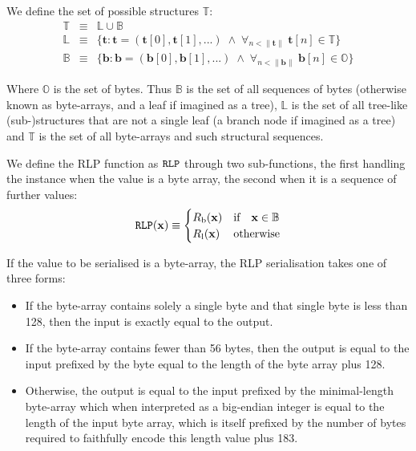\documentclass[9pt,oneside]{amsart}
\makeatletter
\newcommand{\linkdest}[1]{\Hy@raisedlink{\hypertarget{#1}{}}}
\makeatother
\begin{document}
We define the set of possible structures $\mathbb{T}$:
\begin{eqnarray}
\mathbb{T} & \equiv & \mathbb{L} \cup \mathbb{B} \\
\mathbb{L} & \equiv & \{ \mathbf{t}: \mathbf{t} = ( \mathbf{t}[0], \mathbf{t}[1], ... ) \; \wedge \; \forall_{n < \lVert \mathbf{t} \rVert} \; \mathbf{t}[n] \in \mathbb{T} \} \\
\mathbb{B} & \equiv & \{ \mathbf{b}: \mathbf{b} = ( \mathbf{b}[0], \mathbf{b}[1], ... ) \; \wedge \; \forall_{n < \lVert \mathbf{b} \rVert} \; \mathbf{b}[n] \in \mathbb{O} \}
\end{eqnarray}

Where $\mathbb{O}$ is the set of bytes. Thus $\mathbb{B}$ is the set of all sequences of bytes (otherwise known as byte-arrays, and a leaf if imagined as a tree), $\mathbb{L}$ is the set of all tree-like (sub-)structures that are not a single leaf (a branch node if imagined as a tree) and $\mathbb{T}$ is the set of all byte-arrays and such structural sequences.

We define the RLP function as $\mathtt{\tiny RLP}$ through two sub-functions, the first handling the instance when the value is a byte array, the second when it is a sequence of further values:
\begin{equation}
\mathtt{\tiny RLP}(\mathbf{x}) \equiv \begin{cases} R_{\mathrm{b}}(\mathbf{x}) & \text{if} \quad \mathbf{x} \in \mathbb{B} \\ R_{\mathrm{l}}(\mathbf{x}) & \text{otherwise} \end{cases}
\end{equation}

\hypertarget{RLP_serialisation_of_a_byte_array_R__b_word_def}{}\linkdest{R__b}If the value to be serialised is a byte-array, the RLP serialisation takes one of three forms:

\begin{itemize}
\item If the byte-array contains solely a single byte and that single byte is less than 128, then the input is exactly equal to the output.
\item If the byte-array contains fewer than 56 bytes, then the output is equal to the input prefixed by the byte equal to the length of the byte array plus 128.
\item Otherwise, the output is equal to the input prefixed by the minimal-length byte-array which when interpreted as a big-endian integer is equal to the length of the input byte array, which is itself prefixed by the number of bytes required to faithfully encode this length value plus 183.
\end{itemize}
\end{document}
